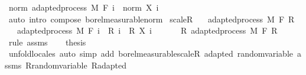 \begin{isabellebody}
\endisatagproof
{\isafoldproof}%
%
\isadelimproof
\isanewline
%
\endisadelimproof
\isanewline
{}\isamarkupfalse%
\ norm{\isacharcolon}{\kern0pt}\ {\isachardoublequoteopen}adapted{\isacharunderscore}{\kern0pt}process\ M\ F\ {\isacharparenleft}{\kern0pt}{\isasymlambda}i\ {\isasymxi}{\isachardot}{\kern0pt}\ norm\ {\isacharparenleft}{\kern0pt}X\ i\ {\isasymxi}{\isacharparenright}{\kern0pt}{\isacharparenright}{\kern0pt}{\isachardoublequoteclose}%
\isadelimproof
\ %
\endisadelimproof
%
\isatagproof
{}\isamarkupfalse%
\ {\isacharparenleft}{\kern0pt}auto\ intro{\isacharcolon}{\kern0pt}\ compose\ borel{\isacharunderscore}{\kern0pt}measurable{\isacharunderscore}{\kern0pt}norm{\isacharparenright}{\kern0pt}%
\endisatagproof
{\isafoldproof}%
%
\isadelimproof
%
\endisadelimproof
\isanewline
\isanewline
{}\isamarkupfalse%
\ scaleR{\isacharcolon}{\kern0pt}\isanewline
\ \ \ {\isachardoublequoteopen}adapted{\isacharunderscore}{\kern0pt}process\ M\ F\ R{\isachardoublequoteclose}\isanewline
\ \ \ {\isachardoublequoteopen}adapted{\isacharunderscore}{\kern0pt}process\ M\ F\ {\isacharparenleft}{\kern0pt}{\isasymlambda}i\ {\isasymxi}{\isachardot}{\kern0pt}\ {\isacharparenleft}{\kern0pt}R\ i\ {\isasymxi}{\isacharparenright}{\kern0pt}\ {\isacharasterisk}{\kern0pt}\isactrlsub R\ {\isacharparenleft}{\kern0pt}X\ i\ {\isasymxi}{\isacharparenright}{\kern0pt}{\isacharparenright}{\kern0pt}{\isachardoublequoteclose}\isanewline
%
\isadelimproof
%
\endisadelimproof
%
\isatagproof
{}\isamarkupfalse%
\ {\isacharminus}{\kern0pt}\isanewline
\ \ \isamarkupfalse%
\ R{\isacharcolon}{\kern0pt}\ adapted{\isacharunderscore}{\kern0pt}process\ M\ F\ R\ \isamarkupfalse%
\ {\isacharparenleft}{\kern0pt}rule\ assms{\isacharparenright}{\kern0pt}\isanewline
\ \ \isamarkupfalse%
\ {\isacharquery}{\kern0pt}thesis\ \isamarkupfalse%
\ {\isacharparenleft}{\kern0pt}unfold{\isacharunderscore}{\kern0pt}locales{\isacharparenright}{\kern0pt}\ {\isacharparenleft}{\kern0pt}auto\ simp\ add{\isacharcolon}{\kern0pt}\ borel{\isacharunderscore}{\kern0pt}measurable{\isacharunderscore}{\kern0pt}scaleR\ adapted\ random{\isacharunderscore}{\kern0pt}variable\ assms\ R{\isachardot}{\kern0pt}random{\isacharunderscore}{\kern0pt}variable\ R{\isachardot}{\kern0pt}adapted{\isacharparenright}{\kern0pt}\isanewline
{}\isamarkupfalse%
%
\endisatagproof
{\isafoldproof}%
%
\isadelimproof
\isanewline
%
\endisadelimproof
\ \ \isanewline
{}\isamarkupfalse%

\end{isabellebody}
